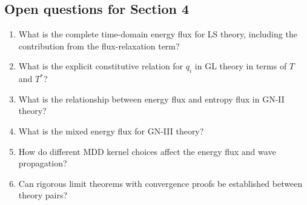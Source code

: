 \subsection{Open questions for Section 4}

\begin{enumerate}[label=\textbf{OQ4.\arabic*}]
\item What is the complete time-domain energy flux for LS theory, including the contribution from the flux-relaxation term? \\ \label{oq:4.1}
\item What is the explicit constitutive relation for $q_i$ in GL theory in terms of $T$ and $T^*$? \\ \label{oq:4.2}
\item What is the relationship between energy flux and entropy flux in GN-II theory? \\ \label{oq:4.3}
\item What is the mixed energy flux for GN-III theory? \\ \label{oq:4.4}
\item How do different MDD kernel choices affect the energy flux and wave propagation? \\ \label{oq:4.5}
\item Can rigorous limit theorems with convergence proofs be established between theory pairs? \\ \label{oq:4.6}
\end{enumerate}

